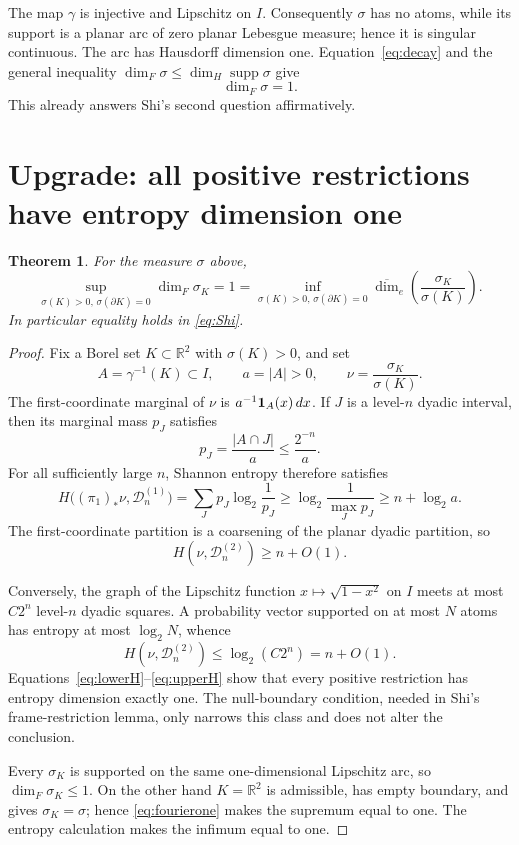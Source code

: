 \documentclass[11pt]{article}
\newtheorem*{theorem}{Theorem}
\begin{document}
The map \(\gamma\) is injective and Lipschitz on \(I\).  Consequently
\(\sigma\) has no atoms, while its support is a planar arc of zero planar
Lebesgue measure; hence it is singular continuous.  The arc has Hausdorff
dimension one.  Equation~\eqref{eq:decay} and the general inequality
\(\dim_F\sigma\leq\dim_H\operatorname{supp}\sigma\) give
\begin{equation}\label{eq:fourierone}
 \dim_F\sigma=1.
\end{equation}
This already answers Shi's second question affirmatively.

\section*{Upgrade: all positive restrictions have entropy dimension one}

\begin{theorem}
For the measure \(\sigma\) above,
\[
 \sup_{\sigma(K)>0,\,\sigma(\partial K)=0}\dim_F\sigma_K
 =1=
 \inf_{\sigma(K)>0,\,\sigma(\partial K)=0}
 \overline{\dim}_e\!\left(\frac{\sigma_K}{\sigma(K)}\right).
\]
In particular equality holds in \eqref{eq:Shi}.
\end{theorem}

\begin{proof}
Fix a Borel set \(K\subset\mathbb R^2\) with \(\sigma(K)>0\), and set
\[
 A=\gamma^{-1}(K)\subset I,\qquad a=|A|>0,
 \qquad \nu=\frac{\sigma_K}{\sigma(K)}.
\]
The first-coordinate marginal of \(\nu\) is
\(a^{-1}{\bf1}_A(x)\,dx\).  If \(J\) is a level-\(n\) dyadic interval,
then its marginal mass \(p_J\) satisfies
\[
 p_J=\frac{|A\cap J|}{a}\leq\frac{2^{-n}}a.
\]
For all sufficiently large \(n\), Shannon entropy therefore satisfies
\[
 H\bigl((\pi_1)_*\nu,\mathcal D_n^{(1)}\bigr)
 =\sum_J p_J\log_2\frac1{p_J}
 \geq \log_2\frac1{\max_Jp_J}
 \geq n+\log_2 a.
\]
The first-coordinate partition is a coarsening of the planar dyadic
partition, so
\begin{equation}\label{eq:lowerH}
 H(\nu,\mathcal D_n^{(2)})\geq n+O(1).
\end{equation}

Conversely, the graph of the Lipschitz function
\(x\mapsto\sqrt{1-x^2}\) on \(I\) meets at most \(C2^n\) level-\(n\)
dyadic squares.  A probability vector supported on at most \(N\) atoms has
entropy at most \(\log_2N\), whence
\begin{equation}\label{eq:upperH}
 H(\nu,\mathcal D_n^{(2)})\leq \log_2(C2^n)=n+O(1).
\end{equation}
Equations~\eqref{eq:lowerH}--\eqref{eq:upperH} show that every positive
restriction has entropy dimension exactly one.  The null-boundary condition,
needed in Shi's frame-restriction lemma, only narrows this class and does not
alter the conclusion.

Every \(\sigma_K\) is supported on the same one-dimensional Lipschitz arc,
so \(\dim_F\sigma_K\leq1\).  On the other hand
\(K=\mathbb R^2\) is admissible, has empty boundary, and gives
\(\sigma_K=\sigma\); hence \eqref{eq:fourierone} makes the supremum equal to
one.  The entropy calculation makes the infimum equal to one.
\end{proof}
\end{document}

